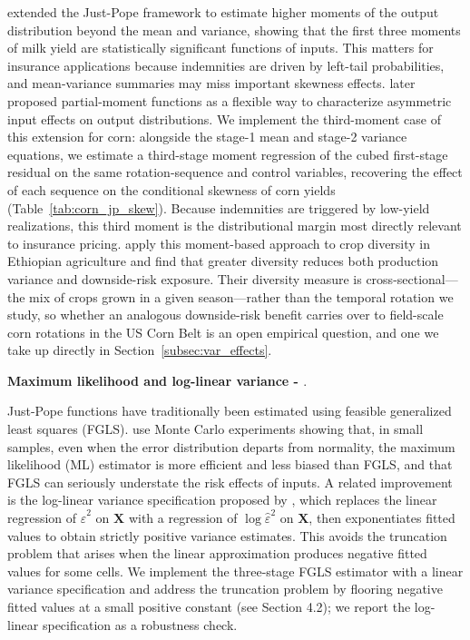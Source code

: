 \documentclass[12pt,letterpaper]{article}
\theoremstyle{remark}
\theoremstyle{remark}
\theoremstyle{plain}
\theoremstyle{definition}
\begin{document}
\cite{antle1983} extended the Just-Pope framework to estimate higher moments of the output distribution beyond the mean and variance, showing that the first three moments of milk yield are statistically significant functions of inputs. This matters for
insurance applications because indemnities are driven by left-tail probabilities, and mean-variance summaries may miss important skewness effects. \cite{Antle2010} later proposed partial-moment functions as a flexible way to characterize asymmetric input effects on output distributions. We implement the third-moment case of this extension for corn: alongside the stage-1 mean and stage-2 variance equations, we estimate a third-stage moment regression of the cubed first-stage residual on the same rotation-sequence and control variables, recovering the effect of each sequence on the conditional skewness of corn yields (Table~\ref{tab:corn_jp_skew}). Because indemnities are triggered by low-yield realizations, this third moment is the distributional margin most directly relevant to insurance pricing. \citet{difalco2009} apply this moment-based approach to crop diversity in Ethiopian agriculture and find that greater diversity reduces both production variance and downside-risk exposure. Their diversity measure is cross-sectional---the mix of crops grown in a given season---rather than the temporal rotation we study, so whether an analogous downside-risk benefit carries over to field-scale corn rotations in the US Corn Belt is an open empirical question, and one we take up directly in Section~\ref{subsec:var_effects}.

\medskip\noindent\textbf{Maximum likelihood and log-linear variance - \cite{Harvey1976, Saha1997}}. 

Just-Pope functions have traditionally been estimated using feasible generalized least squares (FGLS). \cite{Saha1997} use Monte Carlo experiments showing that, in small samples, even when the error distribution departs from normality, the maximum likelihood (ML) estimator is more efficient and less biased than FGLS, and that FGLS can seriously understate the risk effects of inputs. A related improvement is the log-linear variance specification proposed by \cite{Harvey1976}, which replaces the linear regression of $\hat{\varepsilon}^2$ on $\mathbf{X}$ with a regression of $\log \hat{\varepsilon}^2$ on $\mathbf{X}$, then exponentiates fitted values to obtain strictly positive variance estimates. This avoids the truncation problem that arises when the linear approximation produces negative fitted values for some cells. We implement the three-stage FGLS estimator with a linear variance specification and
address the truncation problem by flooring negative fitted values at a small positive constant (see Section 4.2); we report the log-linear specification as a robustness check.
\end{document}
